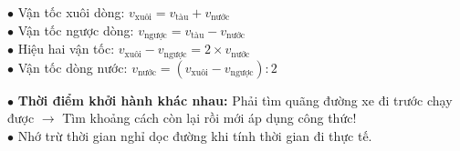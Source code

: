 \documentclass[14pt,a4paper,oneside]{extbook}
\begin{document}
\noindent
\begin{minipage}[t]{0.54\textwidth}
  \begin{tcolorbox}[
    enhanced,
    title={\footnotesize\bfseries\color{white}\faShip\ Chuyển động trên dòng nước},
    colback=green!3!white,
    colframe=green!60!black,
    arc=2.5mm, boxrule=0.8pt, top=1.8mm, bottom=1.8mm, left=2.2mm, right=2.2mm
  ]
    \footnotesize
    $\bullet$ Vận tốc xuôi dòng: $v_{\text{xuôi}} = v_{\text{tàu}} + v_{\text{nước}}$\\
    $\bullet$ Vận tốc ngược dòng: $v_{\text{ngược}} = v_{\text{tàu}} - v_{\text{nước}}$\\
    $\bullet$ Hiệu hai vận tốc: $v_{\text{xuôi}} - v_{\text{ngược}} = 2 \times v_{\text{nước}}$\\
    $\bullet$ Vận tốc dòng nước: $v_{\text{nước}} = (v_{\text{xuôi}} - v_{\text{ngược}}) : 2$
  \end{tcolorbox}
\end{minipage}%
\hfill
\begin{minipage}[t]{0.44\textwidth}
  \begin{tcolorbox}[
    enhanced,
    title={\footnotesize\bfseries\color{white}\faExclamationTriangle\ Mẹo tránh bẫy trắc nghiệm},
    colback=red!2!white,
    colframe=red!70!black,
    arc=2.5mm, boxrule=0.8pt, top=1.8mm, bottom=1.8mm, left=2.2mm, right=2.2mm
  ]
    \footnotesize
    $\bullet$ \textbf{Thời điểm khởi hành khác nhau:} Phải tìm quãng đường xe đi trước chạy được $\rightarrow$ Tìm khoảng cách còn lại rồi mới áp dụng công thức!\\
    $\bullet$ Nhớ trừ thời gian nghỉ dọc đường khi tính thời gian đi thực tế.
  \end{tcolorbox}
\end{minipage}
\end{document}
